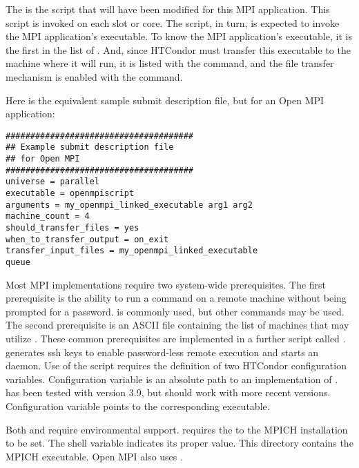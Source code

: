 The  is the  script that will have been
modified for this MPI application.
This script is invoked on each slot or core.
The script, in turn, is expected to invoke the MPI application's executable.
To know the MPI application's executable,
it is the first in the list of .
And, since HTCondor must transfer this executable to the machine where
it will run,
it is listed with the  command,
and the file transfer mechanism is enabled with
the  command.

Here is the equivalent sample submit description file,
but for an Open MPI application:

\begin{verbatim}
######################################
## Example submit description file
## for Open MPI
######################################
universe = parallel
executable = openmpiscript
arguments = my_openmpi_linked_executable arg1 arg2
machine_count = 4
should_transfer_files = yes
when_to_transfer_output = on_exit
transfer_input_files = my_openmpi_linked_executable
queue
\end{verbatim}

Most MPI implementations require two system-wide prerequisites.
The first prerequisite is the ability to run a command
on a remote machine without being prompted for a password.
 is commonly used, but other commands may be used.
The second prerequisite is an ASCII file containing the
list of machines that may utilize .
These common prerequisites are implemented in a further script
called .
 generates ssh keys to enable password-less remote execution
and starts an  daemon.
Use of the  script requires the definition of
two HTCondor configuration variables.
Configuration variable  is an absolute path to
an implementation of .
 has been tested with  version 3.9,
but should work with more recent versions.
Configuration variable  points
to the corresponding  executable.

Both  and 
require environmental support.
 requires the  to the MPICH installation to be set.
The shell variable  indicates its proper value.
This directory contains the MPICH  executable.
Open MPI also uses .


